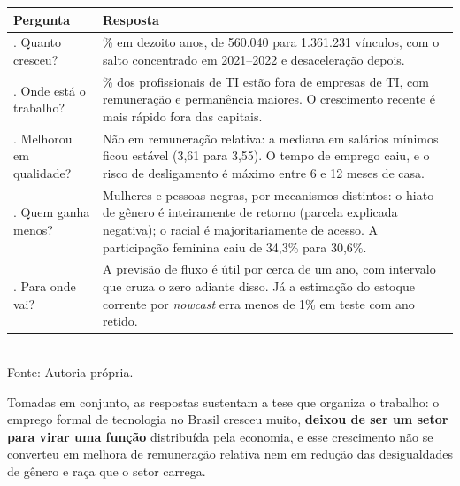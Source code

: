 \begin{quadro}[htbp]
    \centering
    \caption{Síntese das respostas às perguntas de pesquisa}
    \label{quadro:sintese}
    \footnotesize
    \renewcommand{\arraystretch}{1.3}
    \begin{tabularx}{\textwidth}{%
        >{\raggedright\arraybackslash\hsize=0.70\hsize}X
        >{\raggedright\arraybackslash\hsize=1.30\hsize}X}
        \toprule
        \rowcolor{black!8}
        \textbf{Pergunta} & \textbf{Resposta} \\
        \midrule
        1. Quanto cresceu? & 143\% em dezoito anos, de 560.040 para 1.361.231 vínculos, com o salto concentrado em 2021--2022 e desaceleração depois. \\
        2. Onde está o trabalho? & 58\% dos profissionais de TI estão fora de empresas de TI, com remuneração e permanência maiores. O crescimento recente é mais rápido fora das capitais. \\
        3. Melhorou em qualidade? & Não em remuneração relativa: a mediana em salários mínimos ficou estável (3,61 para 3,55). O tempo de emprego caiu, e o risco de desligamento é máximo entre 6 e 12 meses de casa. \\
        4. Quem ganha menos? & Mulheres e pessoas negras, por mecanismos distintos: o hiato de gênero é inteiramente de retorno (parcela explicada negativa); o racial é majoritariamente de acesso. A participação feminina caiu de 34,3\% para 30,6\%. \\
        5. Para onde vai? & A previsão de fluxo é útil por cerca de um ano, com intervalo que cruza o zero adiante disso. Já a estimação do estoque corrente por \textit{nowcast} erra menos de 1\% em teste com ano retido. \\
        \bottomrule
    \end{tabularx}
    \\[4pt]
    Fonte: Autoria própria.
\end{quadro}

Tomadas em conjunto, as respostas sustentam a tese que organiza o trabalho: o emprego formal de tecnologia no Brasil cresceu muito, \textbf{deixou de ser um setor para virar uma função} distribuída pela economia, e esse crescimento não se converteu em melhora de remuneração relativa nem em redução das desigualdades de gênero e raça que o setor carrega.
